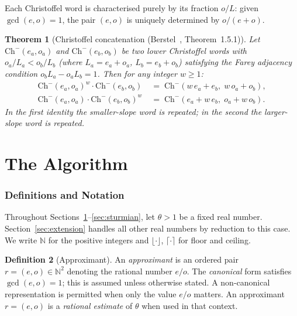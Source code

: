 \documentclass[12pt]{article}
\newtheorem{theorem}{Theorem}[section]
\theoremstyle{definition}
\newtheorem{definition}[theorem]{Definition}
\theoremstyle{remark}
\theoremstyle{plain}
\newcommand{\NN}{\mathbb{N}}
\begin{document}
Each Christoffel word is characterised purely by its fraction $o/L$:
given $\gcd(e,o) = 1$, the pair $(e,o)$ is uniquely determined by $o/(e+o)$.

\begin{theorem}[Christoffel concatenation (Berstel~\cite{berstel2009}, Theorem~1.5.1)]
\label{thm:christoffel-concat}
Let $\mathrm{Ch}^-(e_a, o_a)$ and $\mathrm{Ch}^-(e_b, o_b)$ be two lower Christoffel
words with $o_a/L_a < o_b/L_b$ (where $L_a = e_a + o_a$, $L_b = e_b + o_b$) satisfying the Farey
adjacency condition $o_b L_a - o_a L_b = 1$.
Then for any integer $w \geq 1$:
\begin{align*}
  \mathrm{Ch}^-(e_a, o_a)^w \cdot \mathrm{Ch}^-(e_b, o_b)
  &\;=\; \mathrm{Ch}^-(w\,e_a + e_b,\; w\,o_a + o_b), \\
  \mathrm{Ch}^-(e_a, o_a) \cdot \mathrm{Ch}^-(e_b, o_b)^w
  &\;=\; \mathrm{Ch}^-(e_a + w\,e_b,\; o_a + w\,o_b).
\end{align*}
In the first identity the smaller-slope word is repeated; in the second the
larger-slope word is repeated.
\end{theorem}

\part{The Algorithm}

\section{Definitions and Notation}
\label{sec:definitions}

Throughout Sections~\ref{sec:definitions}--\ref{sec:sturmian}, let $\theta > 1$ be a fixed
real number.
Section~\ref{sec:extension} handles all other real numbers by reduction to this case.
We write $\NN$ for the positive integers and $\lfloor \cdot \rfloor$, $\lceil \cdot \rceil$
for floor and ceiling.

\begin{definition}[Approximant]
\label{def:approximant}
An \emph{approximant} is an ordered pair $r = (e, o) \in \NN^2$ denoting
the rational number $e/o$.  The \emph{canonical} form satisfies
$\gcd(e, o) = 1$; this is assumed unless otherwise stated.  A non-canonical
representation is permitted when only the value $e/o$ matters.
An approximant $r = (e, o)$ is a \emph{rational estimate} of $\theta$ when used in that context.
\end{definition}
\end{document}
